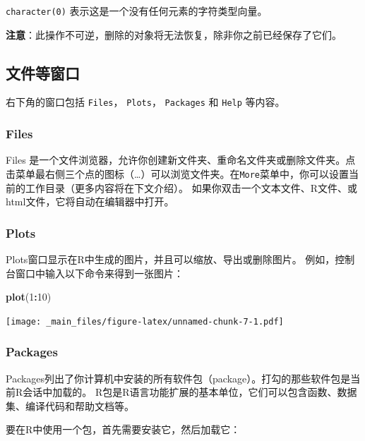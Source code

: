 \documentclass[
]{book}
\newenvironment{Shaded}{\begin{snugshade}}{\end{snugshade}}
\newcommand{\DecValTok}[1]{\textcolor[rgb]{0.00,0.00,0.81}{#1}}
\newcommand{\FunctionTok}[1]{\textcolor[rgb]{0.13,0.29,0.53}{\textbf{#1}}}
\newcommand{\NormalTok}[1]{#1}
\newcommand{\SpecialCharTok}[1]{\textcolor[rgb]{0.81,0.36,0.00}{\textbf{#1}}}
\begin{document}
\texttt{character(0)} 表示这是一个没有任何元素的字符类型向量。

\textbf{注意}：此操作不可逆，删除的对象将无法恢复，除非你之前已经保存了它们。

\subsection{文件等窗口}\label{ux6587ux4ef6ux7b49ux7a97ux53e3}

右下角的窗口包括 \texttt{Files}， \texttt{Plots}， \texttt{Packages} 和 \texttt{Help} 等内容。

\subsubsection{Files}\label{files}

Files 是一个文件浏览器，允许你创建新文件夹、重命名文件夹或删除文件夹。点击菜单最右侧三个点的图标（\ldots）可以浏览文件夹。在\texttt{More}菜单中，你可以设置当前的工作目录（更多内容将在下文介绍）。
如果你双击一个文本文件、R文件、或html文件，它将自动在编辑器中打开。

\subsubsection{Plots}\label{plots}

Plots窗口显示在R中生成的图片，并且可以缩放、导出或删除图片。
例如，控制台窗口中输入以下命令来得到一张图片：

\begin{Shaded}
\begin{Highlighting}[]
\FunctionTok{plot}\NormalTok{(}\DecValTok{1}\SpecialCharTok{:}\DecValTok{10}\NormalTok{)}
\end{Highlighting}
\end{Shaded}

\texttt{[image: \_main\_files/figure-latex/unnamed-chunk-7-1.pdf]}

\subsubsection{Packages}\label{packages}

Packages列出了你计算机中安装的所有软件包（package）。打勾的那些软件包是当前R会话中加载的。
R包是R语言功能扩展的基本单位，它们可以包含函数、数据集、编译代码和帮助文档等。

要在R中使用一个包，首先需要安装它，然后加载它：
\end{document}

